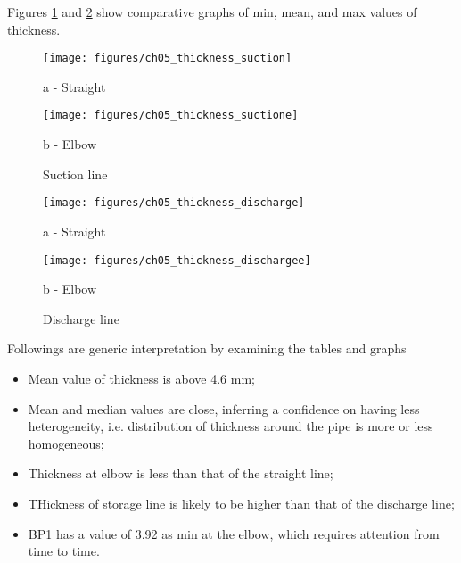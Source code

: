 Figures \ref{ch05_thickness_suction} and \ref{ch05_thickness_dicharge} show comparative graphs of min, mean, and max values of thickness.


\begin{figure}[!htb]
	\begin{minipage}[b]{0.5\linewidth}
		\centering
		\texttt{[image: figures/ch05\_thickness\_suction]}
		\caption*{a - Straight} 
	\end{minipage}
	\hspace{0.05cm}
	\begin{minipage}[b]{0.5\linewidth}
		\centering
		\texttt{[image: figures/ch05\_thickness\_suctione]}
		\caption*{b - Elbow} 
	\end{minipage}
	\caption{Suction line}
	\label{ch05_thickness_suction}
\end{figure}

\begin{figure}[!htb]
	\begin{minipage}[b]{0.5\linewidth}
		\centering
		\texttt{[image: figures/ch05\_thickness\_discharge]}
		\caption*{a - Straight} 
	\end{minipage}
	\hspace{0.05cm}
	\begin{minipage}[b]{0.5\linewidth}
		\centering
		\texttt{[image: figures/ch05\_thickness\_dischargee]}
		\caption*{b - Elbow} 
	\end{minipage}
	\caption{Discharge line}
	\label{ch05_thickness_dicharge}
\end{figure}

Followings are generic interpretation by examining the tables and graphs
\begin{itemize}
\item Mean value of thickness is above 4.6 mm;
\item Mean and median values are close, inferring a confidence on having less heterogeneity, i.e. distribution of thickness around the pipe is more or less homogeneous;
\item Thickness at elbow is less than that of the straight line;
\item THickness of storage line is likely to be higher than that of the discharge line;
\item BP1 has a value of 3.92 as min at the elbow, which requires attention from time to time.
\end{itemize}

